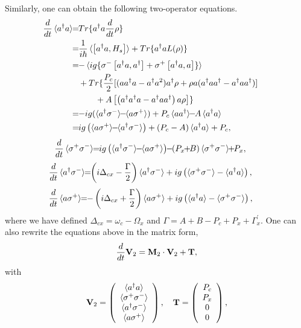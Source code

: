 Similarly, one can obtain the following two-operator equations.
 \begin{align}
  \!\!\!\!\!\!\!\!\! \dt \Haap \!\! &=\!\!Tr\lbrace \adag a \dt \rho\rbrace\\
   &=\!\! \frac{1}{i\hbar}\braket{\left[ \adag a,H_s\right]}+Tr\lbrace \adag a L(\rho) \rbrace \nonumber\\
   &=\!\! -\braket{ig\lbrace\sigm \left[\adag a,\adag\right] +\sigp\left[\adag a,a\right] \rbrace }\nonumber \\
    &\quad +Tr\lbrace \frac{P_c}{2} [ (a\adag a-\adag a^2)\adag\rho
     +\rho a(\adag a\adag-\adag a \adag) ]\nonumber \\
     &\quad \quad \quad +A\left[ \left( \adag \adag a -\adag a\adag\right)a\rho \right] \rbrace\nonumber \\
   &=\!\! -ig(\Has\!\!-\!\! \Hsa)+P_c \braket{a a^{\dagger}}\!\!-\!\! A\braket{a^{\dagger} a}\nonumber \\
   &=\!\!  ig\left(\Hsa\!\!-\!\! \Has\right)+ (P_c - A) \braket{a^{\dagger} a} + P_c,\label{eq:aa}
 \end{align}
\begin{equation}
  \!\!\!\!\!\!\!\!\! \dt \Hssp \!\!=\!\! ig\left(\Has\!\!-\!\! \Hsa\right)\!\!-\!\!(P_x\!\!+\!\!B)\Hssp\!\!+\!\! P_x,
\label{eq:ss}
\end{equation}
\begin{equation}
  \!\!\!\!\!\!\!\!\! \dt \Has \!\!=\!\! \left(i\Delta_{cx} - \frac{\Gamma}{2}\right)\Has +ig\left(\Hssp-\Haap\right),
\label{eq:as}
\end{equation}
\begin{equation}
  \!\!\!\!\!\!\!\!\! \dt \Hsa \!\!=\!\! -\left(i\Delta_{cx} + \frac{\Gamma}{2}\right)\Hsa +ig\left(\Haap-\Hssp\right),
\label{eq:sa}
\end{equation}
where we have defined $\Delta_{cx}=\omega_c-\Omega_x$ and $\Gamma=A+B-P_c+P_x+\Gamma_x^{\prime}$. One can also rewrite the equations above in the matrix form,
\begin{equation}\label{eq:V2}
\frac{d}{dt}\mathbf{V}_2=\mathbf{M}_2\cdot\mathbf{V}_2+\mathbf{T},
\end{equation}
with
\begin{equation}
\mathbf{V}_2=\left(\begin{array}{c}\mathinner{\langle{a^{\dagger}a}\rangle}\\ \mathinner{\langle{\sigma^{+}\sigma^{-}}\rangle} \\ \mathinner{\langle{a^{\dagger}\sigma^{-}}\rangle}\\ \mathinner{\langle{a\sigma^{+}}\rangle} \end{array}\right), \quad \mathbf{T}=\left(\begin{array}{c}P_c\\ P_x \\ 0 \\ 0 \end{array}\right),
\end{equation}
